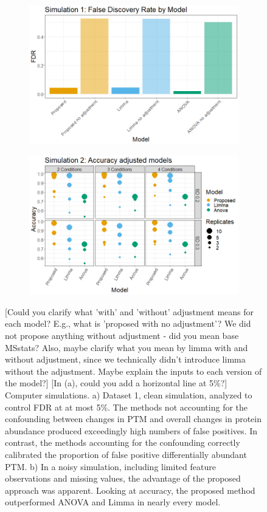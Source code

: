 \documentclass[mcp]{article}
\numberwithin{table}{section}
\def\todo#1{{\color{red}[#1]}}
\begin{document}
\begin{figure}[ht]
\centering
\begin{subfigure}[c]{0.7\linewidth}
\includegraphics[width=1\textwidth]{images/sim1_FDR_all_models.png}
\caption{}
\label{fig:sim1_fdr}
\end{subfigure}
\begin{subfigure}[c]{0.825\linewidth}
\includegraphics[width=1\textwidth]{images/sim3_Accuracy.png}
\caption{}
\label{fig:sim2_acc}
\end{subfigure}
\caption{\todo{Could you clarify what 'with' and 'without' adjustment means for each model? E.g., what is 'proposed with no adjustment'? We did not propose anything without adjustment - did you mean base MSstats? Also, maybe clarify what you mean by limma with and without adjustment, since we technically didn't introduce limma without the adjustment. Maybe explain the inputs to each version of the model?} \todo{In (a), could you add a horizontal line at 5\%?} Computer simulations. a) Dataset 1, clean simulation, analyzed to control FDR at at most 5\%. The methods not accounting for the confounding between changes in PTM and overall changes in protein abundance produced exceedingly high numbers of false positives. In contrast, the methods accounting for the confounding correctly calibrated the proportion of false positive differentially abundant PTM.  b) In a noisy simulation, including limited feature observations and missing values, the advantage of the proposed approach was apparent. Looking at accuracy, the proposed method outperformed ANOVA and Limma in nearly every model.
}
\end{figure}
\end{document}
